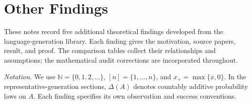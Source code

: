 \documentclass[11pt,letterpaper]{article}
\theoremstyle{plain}
\theoremstyle{definition}
\numberwithin{equation}{section}
\newcommand{\N}{\mathbb N}
\begin{document}
\section*{Other Findings}
\tableofcontents
\vspace{12pt}
\noindent These notes record five additional theoretical findings developed from the language-generation library. Each finding gives the motivation, source papers, result, and proof. The comparison tables collect their relationships and assumptions; the mathematical audit corrections are incorporated throughout.

\smallskip
\noindent\textit{Notation.} We use $\N=\{0,1,2,\ldots\}$, $[n]=\{1,\ldots,n\}$, and $x_+=\max\{x,0\}$. In the representative-generation sections, $\Delta(A)$ denotes countably additive probability laws on $A$. Each finding specifies its own observation and success conventions.
\clearpage





\clearpage

\clearpage

\end{document}
